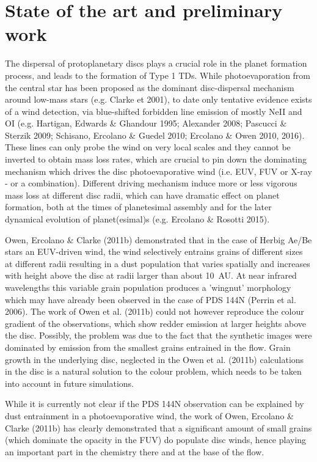 \documentclass[10pt,fleqn,twoside]{article}
\newcommand{\Tcol}{\color{blue}}
\begin{document}
\section{\Tcol State of the art and preliminary work}
\renewcommand{\leftmark}{\sc State of the Art and preliminary work}

The dispersal of protoplanetary discs plays a crucial role in the
planet formation process, and leads to the formation of Type
1 TDs. While photoevaporation from the central star has been proposed
as the dominant disc-dispersal mechanism around low-mass stars
(e.g. Clarke et 2001), to date only tentative evidence exists of a
wind detection, via blue-shifted forbidden line emission of mostly
NeII and OI (e.g. Hartigan, Edwards \& Ghandour 1995; Alexander 2008;
Pascucci \& Sterzik 2009; Schisano, Ercolano \& Guedel 2010; Ercolano
\& Owen 2010, 2016). These lines can only probe the wind on very local
scales and they cannot be inverted to obtain mass loss rates, which
are crucial to pin down the dominating mechanism which drives the disc
photoevaporative wind
(i.e. EUV, FUV or X-ray - or a combination). Different driving
mechanism induce more or less vigorous mass loss at different disc
radii, which  can have dramatic effect on planet formation, both at
the times of planetesimal assembly and for the later dynamical
evolution of planet(esimal)s (e.g. Ercolano \& Rosotti 2015).  

Owen, Ercolano \& Clarke (2011b) demonstrated that in the case of
Herbig Ae/Be stars an EUV-driven wind, the wind selectively entrains
grains of different sizes at different radii resulting in a dust
population that varies spatially and increases with height above the
disc at radii larger than about 10~AU. At near infrared wavelengths
this variable grain population produces a 'wingnut' morphology which
may have already been observed in the case of PDS 144N (Perrin et al.
2006). The work of Owen et al. (2011b) could not however reproduce the
colour gradient of the observations, which show redder emission at
larger heights above the disc. Possibly, the problem was due to the
fact that the synthetic images were dominated by emission from the
smallest grains entrained in the flow. Grain growth in the underlying
disc, neglected in the
Owen et al. (2011b) calculations in the disc is a natural solution to
the colour problem, which needs to be taken into account in future
simulations. 

While it is currently not clear if the PDS 144N observation can be
explained by dust entrainment in a photoevaporative wind, the work of
Owen, Ercolano \& Clarke (2011b) has clearly demonstrated that a
significant amount of small grains (which dominate the opacity in the
FUV) do populate disc winds, hence playing an important part in the
chemistry there and at the base of the flow. 
\end{document}
